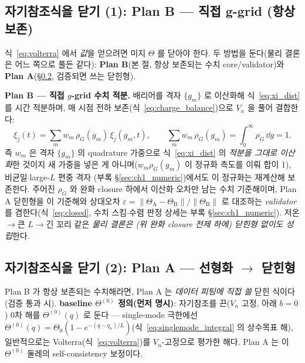 \subsection{자기참조식을 닫기 (1): Plan B — 직접 g-grid (항상 보존)}\label{sec:planB}
식~\eqref{eq:volterra} 에서 \emph{값}을 얻으려면 미지 $\Theta$ 를 닫아야 한다. 두 방법을 둔다(물리 결론은 어느
쪽으로 풀든 같다): \textbf{Plan B}(본 절, 항상 보존되는 수치 core/validator)와 \textbf{Plan A}(\S\ref{sec:planA},
검증되면 쓰는 닫힌형).

\textbf{Plan B — 직접 $g$-grid 수치 적분.} 배리어를 격자 $\{g_m\}$ 로 이산화해
식~\eqref{eq:xi_dist} 를 시간 적분하며, 매 시점 전하 보존(식~\eqref{eq:charge_balance})으로 $V_n$ 을 풀어 결합한다:
\begin{equation*}
\xi_j(t)=\sum_m w_m\,\rho_G(g_m)\,\xi_j(g_m,t),\qquad \sum_m w_m\,\rho_G(g_m)=\int_0^\infty\rho_G\,\dd g=1.
\end{equation*}
즉 $w_m$ 은 격자 $\{g_m\}$ 의 quadrature 가중으로 식~\eqref{eq:xi_dist} 의 \emph{적분을 그대로 이산화}한 것이지
새 가중을 넣은 게 아니며($w_m\rho_G(g_m)$ 이 정규화 측도를 이뤄 합이 1), 비균일$\cdot$large-$L$ 편중 격자
(부록 \S\ref{sec:ch1_numeric})에서도 이 정규화는 재계산해 보존한다. 주어진 $\rho_G$ 와 완화 closure 하에서
이산화 오차만 남는 수치 기준해이며, Plan A 닫힌형을 이 기준해와 상대오차
$\varepsilon=\lVert\Theta_\mathrm A-\Theta_\mathrm B\rVert/\lVert\Theta_\mathrm B\rVert$ 로 대조하는 \emph{validator}
를 겸한다(식~\eqref{eq:closed}, 수치 스킴$\cdot$수렴 판정 상세는 부록 \S\ref{sec:ch1_numeric}). 저온$\to$큰
$L$$\to$긴 꼬리 같은 \emph{물리 결론은 (위 완화 closure 전제 하에) 닫힌형 없이도 성립}한다.

\subsection{자기참조식을 닫기 (2): Plan A — 선형화 $\to$ 닫힌형}\label{sec:planA}
Plan B 가 항상 보존되는 수치해라면, Plan A 는 \emph{데이터 피팅에 직접 쓸} 닫힌 식이다(검증 통과 시). \textbf{baseline
$\Theta^{(0)}$ 정의(먼저 명시)}: 자기참조를 끈($V_n$ 고정, 아래 $b=0$) 0차 해를 $\Theta^{(0)}(q)$ 로 둔다 —
single-mode 극한에선 $\Theta^{(0)}(q)=\Theta_0(1-e^{-(q-q_a)/L})$(식~\eqref{eq:singlemode_integral} 의 상수목표
해), 일반적으로는 Volterra(식~\eqref{eq:volterra})를 $V_n$-고정으로 평가한 해다. Plan A 는 이 $\Theta^{(0)}$ 둘레의
self-consistency 보정이다.

